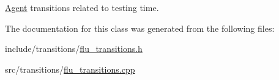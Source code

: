 \hyperlink{classAgent}{Agent} transitions related to testing time. 



The documentation for this class was generated from the following files\+:\begin{DoxyCompactItemize}
\item 
include/transitions/\hyperlink{flu__transitions_8h}{flu\+\_\+transitions.\+h}\item 
src/transitions/\hyperlink{flu__transitions_8cpp}{flu\+\_\+transitions.\+cpp}\end{DoxyCompactItemize}
